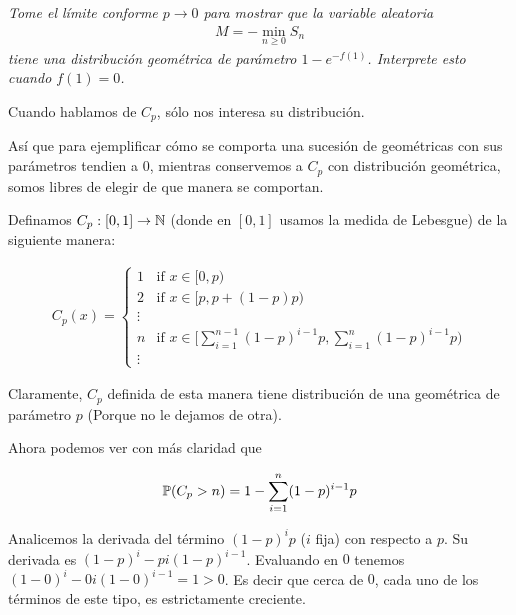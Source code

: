 \emph{
    Tome el límite conforme $p\to 0$ para mostrar que la variable aleatoria 
    \begin{align}
        M=-\min_{n\geq 0}S_n
    \end{align}
    tiene una distribuci\'on geom\'etrica de par\'ametro $1-e^{-f(1)}$. Interprete esto cuando $f(1)=0$.
}

Cuando hablamos de $C_p$, sólo nos interesa su distribución.\pn

Así que para ejemplificar cómo se comporta una sucesión de geométricas con sus parámetros tendien a $0$,
mientras conservemos a $C_p$ con distribución geométrica, somos libres de elegir de que manera se comportan.\pn

Definamos $C_p : [0,1] \rightarrow \mathbb{N}$ (donde en $[0,1]$ usamos la medida de Lebesgue) de la siguiente manera:

\begin{align}
    C_{p}(x) = 
        \begin{cases}
            1       & \mbox{if } x \in [0, p)                                                                               \\
            2       & \mbox{if } x \in [p, p + (1-p)p)                                                                      \\
            \vdots  &                                                                                                       \\
            n       & \mbox{if } x \in \bigg[\sum_{i = 1}^{n - 1} (1 - p)^{i - 1}p , \sum_{i = 1}^n (1-p)^{i-1}p \bigg)     \\
            \vdots  &                                               
        \end{cases}
\end{align}

Claramente, $C_p$ definida de esta manera tiene distribución de una geométrica de parámetro $p$ (Porque no le dejamos de otra).\pn

Ahora podemos ver con más claridad que 

\begin{align}
    \mathbb{P}(C_p > n) = 1 - \sum_{i = 1}^n (1-p)^{i-1}p
\end{align}

Analicemos la derivada del término $(1-p)^{i}p$ ($i$ fija) con respecto a $p$. Su derivada es $(1-p)^i - p i (1-p)^{i-1}$.
Evaluando en $0$ tenemos \\
$(1-0)^i - 0 i (1-0)^{i-1} = 1 > 0$. Es decir que cerca de $0$, cada uno de los términos de este tipo, es 
estrictamente creciente.\pn

